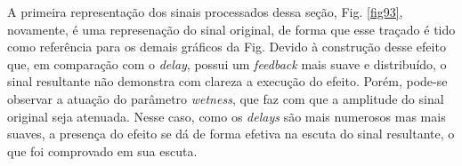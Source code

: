A primeira representação dos sinais processados dessa seção, Fig. \ref{fig93}, novamente, é uma represenação do sinal original, de forma que esse traçado é tido como referência para os demais gráficos da Fig. %
Devido à construção desse efeito que, em comparação com o \textit{delay}, possui um \textit{feedback} mais suave e distribuído, o sinal resultante não demonstra com clareza a execução do efeito. Porém, pode-se observar a atuação do parâmetro \textit{wetness}, que faz com que a amplitude do sinal original seja atenuada. Nesse caso, como os \textit{delays} são mais numerosos mas mais suaves, a presença do efeito se dá de forma efetiva na escuta do sinal resultante, o que foi comprovado em sua escuta.

